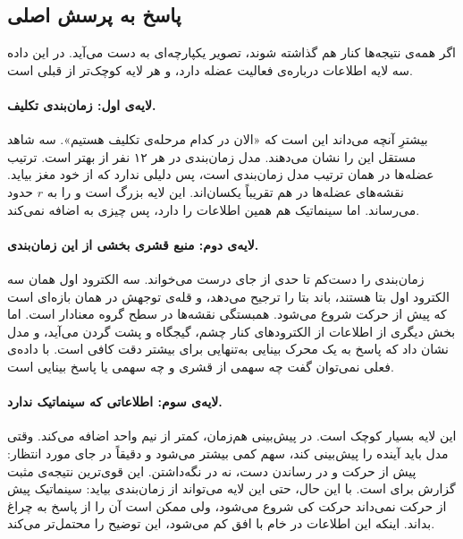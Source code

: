\subsection{پاسخ به پرسش اصلی}

اگر همه‌ی نتیجه‌ها کنار هم گذاشته شوند، تصویر یکپارچه‌ای به دست می‌آید.  در این داده سه لایه اطلاعات درباره‌ی فعالیت عضله دارد، و هر لایه کوچک‌تر از قبلی است.

\paragraph{لایه‌ی اول: زمان‌بندی تکلیف.} بیشترِ آنچه  می‌داند این است که «الان در کدام مرحله‌ی تکلیف هستیم». سه شاهد مستقل این را نشان می‌دهند. مدل زمان‌بندی در هر ۱۲ نفر از  بهتر است. ترتیب عضله‌ها در  همان ترتیب مدل زمان‌بندی است، پس دلیلی ندارد که از خود مغز بیاید. نقشه‌های عضله‌ها در  هم تقریباً یکسان‌اند. این لایه بزرگ است و  را به $r$ حدود  می‌رساند. اما سینماتیک هم همین اطلاعات را دارد، پس چیزی به  اضافه نمی‌کند.

\paragraph{لایه‌ی دوم: منبع قشری بخشی از این زمان‌بندی.}  زمان‌بندی را دست‌کم تا حدی از جای درست می‌خواند. سه الکترود اول  همان سه الکترود اول  بتا هستند،  باند بتا را ترجیح می‌دهد، و قله‌ی توجهش در همان بازه‌ای است که  پیش از حرکت شروع می‌شود. همبستگی نقشه‌ها در سطح گروه معنادار است. اما بخش دیگری از اطلاعات  از الکترودهای کنار چشم، گیجگاه و پشت گردن می‌آید، و مدل  نشان داد که پاسخ به یک محرک بینایی به‌تنهایی برای بیشتر دقت  کافی است. با داده‌ی فعلی نمی‌توان گفت چه سهمی از  قشری و چه سهمی  یا پاسخ بینایی است.

\paragraph{لایه‌ی سوم: اطلاعاتی که سینماتیک ندارد.} این لایه بسیار کوچک است. در پیش‌بینی هم‌زمان،  کمتر از نیم واحد  اضافه می‌کند. وقتی مدل باید آینده را پیش‌بینی کند، سهم  کمی بیشتر می‌شود و دقیقاً در جای مورد انتظار: پیش از حرکت و در رساندن دست، نه در نگه‌داشتن. این قوی‌ترین نتیجه‌ی مثبت گزارش برای  است. با این حال، حتی این لایه می‌تواند از زمان‌بندی بیاید: سینماتیک پیش از حرکت نمی‌داند حرکت کی شروع می‌شود، ولی  ممکن است آن را از پاسخ به چراغ  بداند. اینکه این اطلاعات در  خام با افق کم می‌شود، این توضیح را محتمل‌تر می‌کند.

